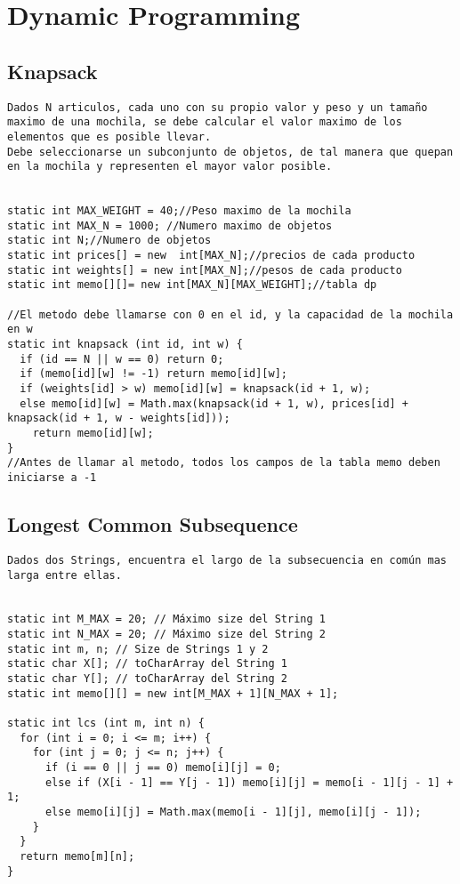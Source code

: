 \documentclass[10pt,letterpaper,twocolumn,twosided]{article}
\begin{document}
\section{Dynamic Programming}

\subsection{Knapsack}
\begin{lstlisting}
Dados N articulos, cada uno con su propio valor y peso y un tamaño maximo de una mochila, se debe calcular el valor maximo de los elementos que es posible llevar.
Debe seleccionarse un subconjunto de objetos, de tal manera que quepan en la mochila y representen el mayor valor posible.


static int MAX_WEIGHT = 40;//Peso maximo de la mochila
static int MAX_N = 1000; //Numero maximo de objetos
static int N;//Numero de objetos 
static int prices[] = new  int[MAX_N];//precios de cada producto
static int weights[] = new int[MAX_N];//pesos de cada producto
static int memo[][]= new int[MAX_N][MAX_WEIGHT];//tabla dp

//El metodo debe llamarse con 0 en el id, y la capacidad de la mochila en w
static int knapsack (int id, int w) {
  if (id == N || w == 0) return 0;
  if (memo[id][w] != -1) return memo[id][w];
  if (weights[id] > w) memo[id][w] = knapsack(id + 1, w);
  else memo[id][w] = Math.max(knapsack(id + 1, w), prices[id] + knapsack(id + 1, w - weights[id]));
	return memo[id][w];
}
//Antes de llamar al metodo, todos los campos de la tabla memo deben iniciarse a -1	
\end{lstlisting}

\subsection{Longest Common Subsequence}
\begin{lstlisting}
Dados dos Strings, encuentra el largo de la subsecuencia en común mas larga entre ellas.


static int M_MAX = 20; // Máximo size del String 1
static int N_MAX = 20; // Máximo size del String 2 
static int m, n; // Size de Strings 1 y 2
static char X[]; // toCharArray del String 1
static char Y[]; // toCharArray del String 2
static int memo[][] = new int[M_MAX + 1][N_MAX + 1];

static int lcs (int m, int n) {
  for (int i = 0; i <= m; i++) {
    for (int j = 0; j <= n; j++) {
      if (i == 0 || j == 0) memo[i][j] = 0;
      else if (X[i - 1] == Y[j - 1]) memo[i][j] = memo[i - 1][j - 1] + 1;
      else memo[i][j] = Math.max(memo[i - 1][j], memo[i][j - 1]);
    }
  }
  return memo[m][n];
}\end{lstlisting}
\end{document}
